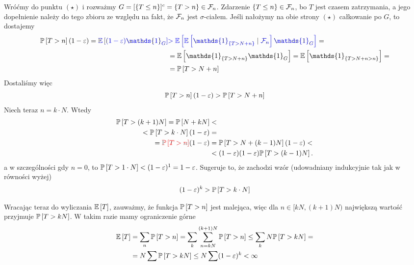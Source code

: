 \begin{solution}
  Wróćmy do punktu $(\star)$ i rozważmy $G=[\{T\leq n\}]^c=\{T>n\}\in\mathcal{F}_n$. Zdarzenie $\{T\leq n\}\in\mathcal{F}_n$, bo $T$ jest czasem zatrzymania, a jego dopełnienie należy do tego zbioru ze względu na fakt, że $\mathcal{F}_n$ jest $\sigma$-ciałem. Jeśli nałożymy na obie strony $(\star)$ całkowanie po $G$, to dostajemy
  \begin{align*}
    \prob{T>n}(1-\varepsilon)={\color{blue}\expected{(1-\varepsilon)\mathds{1}_G}}&{\color{blue}>\expected{\expected{\mathds{1}_{\{T> N+n\}}}{\set{F}_n}\mathds{1}_G} }=\\ 
                                                                                  &=\expected{\mathds{1}_{\{T> N+n\}}\mathds{1}_G}=\expected{\mathds{1}_{\{T>N+n>n\}}}=\\ 
                                                                                  &=\prob{T>N+n}
  \end{align*}
  Dostaliśmy więc
  $$\prob{T>n}(1-\varepsilon)>\prob{T>N+n}$$
  Niech teraz $n=k\cdot N$. Wtedy
  \begin{align*}
    \prob{T>(k+1)N}=\prob{N+kN}&<\\
    <\prob{T>k\cdot N}(1-\varepsilon)&=\\ 
    = {\color{red}\prob{T>n}}(1-\varepsilon)&=\prob{T>N+(k-1)N}(1-\varepsilon)<\\ 
                                                                             &<(1-\varepsilon)(1-\varepsilon)\prob{T>(k-1)N}.
  \end{align*}
  a w szczególności gdy $n=0$, to $\prob{T>1\cdot N}<(1-\varepsilon)^1=1-\varepsilon$. Sugeruje to, że zachodzi wzór (udowadniany indukcyjnie tak jak w równości wyżej)
  $$(1-\varepsilon)^k>\prob{T>k\cdot N}$$

  Wracając teraz do wyliczania $\expected{T}$, zauważmy, że funkcja $\prob{T>n}$ jest malejąca, więc dla $n\in[kN, (k+1)N)$ największą wartość przyjmuje $\prob{T>kN}$. W takim razie mamy ograniczenie górne
  \begin{align*}
    \expected{T}&=\sum_{n}\prob{T>n}=\sum_{k}\sum_{n=kN}^{(k+1)N}\prob{T>n}\leq\sum_kN\prob{T>kN}=\\ 
                &= N\sum\prob{T>kN}\leq N\sum(1-\varepsilon)^k<\infty
  \end{align*}
\end{solution}
